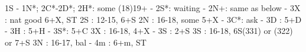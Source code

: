 1S - 1N*; 2C*-2D*; 
2H*: some (18)19+
   - 2S*: waiting
   		- 2N+: same as below
   - 3X : nat good 6+X, ST
2S : 12-15, 6+S
2N : 16-18, some 5+X
   - 3C*: ask
		- 3D : 5+D
		- 3H : 5+H
		- 3S*: 5+C
3X : 16-18, 4+X
   - 3S : 2+S
3S : 16-18, 6S(331) or (322) or 7+S
3N : 16-17, bal
   - 4m : 6+m, ST